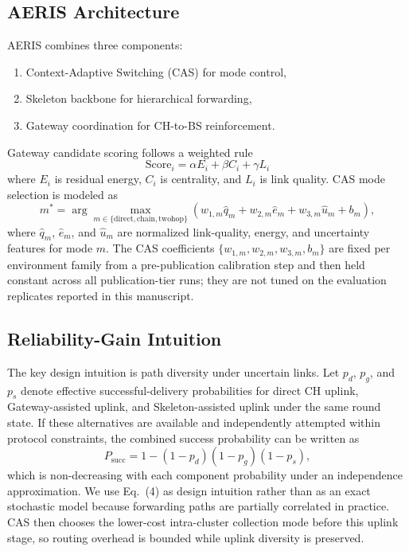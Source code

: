 ﻿\documentclass[sensors,article,submit,moreauthors,pdftex]{Definitions/mdpi}
\begin{document}
\subsection{AERIS Architecture}
AERIS combines three components:
\begin{enumerate}
\item Context-Adaptive Switching (CAS) for mode control,
\item Skeleton backbone for hierarchical forwarding,
\item Gateway coordination for CH-to-BS reinforcement.
\end{enumerate}
Gateway candidate scoring follows a weighted rule
\begin{equation}
\mathrm{Score}_i = \alpha E_i + \beta C_i + \gamma L_i
\end{equation}
where $E_i$ is residual energy, $C_i$ is centrality, and $L_i$ is link quality.
CAS mode selection is modeled as
\begin{equation}
m^{*}=\arg\max_{m\in\{\mathrm{direct},\mathrm{chain},\mathrm{twohop}\}}
\left(w_{1,m}\hat{q}_{m}+w_{2,m}\hat{e}_{m}+w_{3,m}\hat{u}_{m}+b_m\right),
\end{equation}
where $\hat{q}_{m}$, $\hat{e}_{m}$, and $\hat{u}_{m}$ are normalized link-quality, energy, and uncertainty features for mode $m$.
The CAS coefficients $\{w_{1,m}, w_{2,m}, w_{3,m}, b_m\}$ are fixed per environment family from a pre-publication calibration step and then held constant across all publication-tier runs; they are not tuned on the evaluation replicates reported in this manuscript.

\subsection{Reliability-Gain Intuition}
The key design intuition is path diversity under uncertain links. Let \(p_d\), \(p_g\), and \(p_s\) denote effective successful-delivery probabilities for direct CH uplink, Gateway-assisted uplink, and Skeleton-assisted uplink under the same round state. If these alternatives are available and independently attempted within protocol constraints, the combined success probability can be written as
\begin{equation}
P_{\mathrm{succ}} = 1 - (1-p_d)(1-p_g)(1-p_s),
\end{equation}
which is non-decreasing with each component probability under an independence approximation. We use Eq.~(4) as design intuition rather than as an exact stochastic model because forwarding paths are partially correlated in practice. CAS then chooses the lower-cost intra-cluster collection mode before this uplink stage, so routing overhead is bounded while uplink diversity is preserved.
\end{document}
